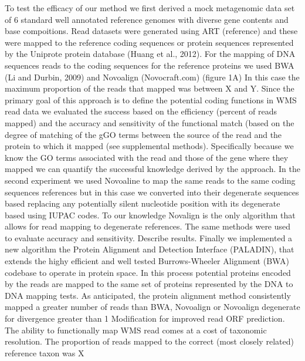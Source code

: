 To test the efficacy of our method we first derived a mock metagenomic data set of 6 standard well annotated reference genomes with diverse gene contents and base compoitions.  Read datasets were generated using ART (reference) and these were mapped to the reference coding sequences or protein sequences represented by the Uniprote protein database (Huang et al., 2012).  For the mapping of DNA sequences reads to the coding sequences for the reference proteins we used BWA (Li and Durbin, 2009) and Novoalign (Novocraft.com) (figure 1A)  In this case the maximum proportion of the reads that mapped was between X and Y.  Since the primary goal of this approach is to define the potential coding functions in WMS read data we evaluated the success based on the efficiency (percent of reads mapped) and the accuracy and sensitivity of the functional match (based on the degree of matching of the gGO terms between the source of the read and the protein to which it mapped  (see supplemental methods).  Specifically because we know the GO terms associated with the read and those of the gene where they mapped we can quantify the successful knowledge derived by the approach.
 In the second experiment we used Novoaline to map the same reads to the same coding sequences references but in this case we converted into their degenerate sequences based replacing any potentially silent nucleotide position with its degenerate based using IUPAC codes.  To our knowledge Novalign is the only algorithm that allows for read mapping to degenerate references.  The same methods were used to evaluate accuracy and sensitivity.  Describe results.
Finally we implemented a new algorithm the Protein Alignment and Detection Interface (PALADIN), that extends the highy efficient and well tested Burrows-Wheeler Alignment (BWA) codebase to operate in protein space.  In this process potential proteins encoded by the reads are mapped to the same set of proteins represented by the DNA to DNA  mapping tests.  As anticipated, the protein alignment method consistently mapped a greater number of reads than BWA, Novoalign or Novoalign degenerate for divergence greater than 1%
Modification for improved read ORF prediction. 
The ability to functionally map WMS read comes at a cost of taxonomic resolution.  The proportion of reads mapped to the correct (most closely related) reference taxon was X %


  